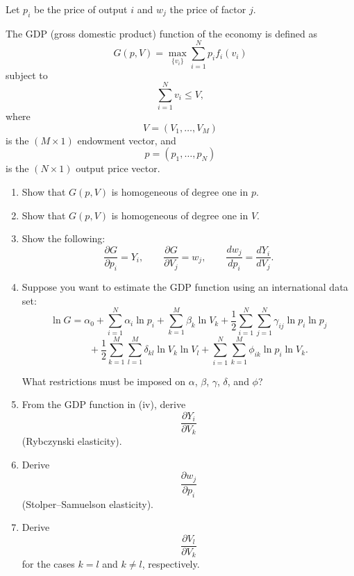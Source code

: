 Let $p_i$ be the price of output $i$ and $w_j$ the price of factor $j$.

The GDP (gross domestic product) function of the economy is defined as
\[
G(p,V)
=
\max_{\{v_i\}}
\sum_{i=1}^N p_i f_i(v_i)
\]
subject to
\[
\sum_{i=1}^N v_i \le V,
\]
where
\[
V=(V_1,\dots,V_M)
\]
is the $(M\times 1)$ endowment vector, and
\[
p=(p_1,\dots,p_N)
\]
is the $(N\times 1)$ output price vector.

\begin{enumerate}
    \item[(i)] Show that $G(p,V)$ is homogeneous of degree one in $p$.
    
    \item[(ii)] Show that $G(p,V)$ is homogeneous of degree one in $V$.
    
    \item[(iii)] Show the following:
    \[
    \frac{\partial G}{\partial p_i} = Y_i,
    \qquad
    \frac{\partial G}{\partial V_j} = w_j,
    \qquad
    \frac{dw_j}{dp_i} = \frac{dY_i}{dV_j}.
    \]
    
    \item[(iv)] Suppose you want to estimate the GDP function using an
    international data set:
    \[
    \ln G
    =
    \alpha_0
    +
    \sum_{i=1}^N \alpha_i \ln p_i
    +
    \sum_{k=1}^M \beta_k \ln V_k
    +
    \frac{1}{2}
    \sum_{i=1}^N \sum_{j=1}^N \gamma_{ij} \ln p_i \ln p_j
    \]
    \[
    \qquad
    +
    \frac{1}{2}
    \sum_{k=1}^M \sum_{l=1}^M \delta_{kl} \ln V_k \ln V_l
    +
    \sum_{i=1}^N \sum_{k=1}^M \phi_{ik} \ln p_i \ln V_k.
    \]
    
    What restrictions must be imposed on $\alpha$, $\beta$, $\gamma$,
    $\delta$, and $\phi$?
    
    \item[(v)] From the GDP function in (iv), derive
    \[
    \frac{\partial Y_i}{\partial V_k}
    \]
    (Rybczynski elasticity).
    
    \item[(vi)] Derive
    \[
    \frac{\partial w_j}{\partial p_i}
    \]
    (Stolper--Samuelson elasticity).
    
    \item[(vii)] Derive
    \[
    \frac{\partial V_l}{\partial V_k}
    \]
    for the cases $k=l$ and $k\ne l$, respectively.
\end{enumerate}